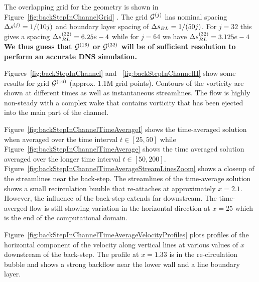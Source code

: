 The overlapping grid for the geometry is shown in Figure~\ref{fig:backStepInChannelGrid} . 
The grid ${\mathcal G}^{(j)}$ has nominal spacing $\Delta s^{(j)}=1/(10 j)$ and boundary layer spacing of $\Delta s_{BL}=1/(50 j)$. 
For $j=32$ this gives a spacing $\Delta s_{BL}^{(32)} = 6.25e-4$ while for $j=64$  we have $\Delta s_{BL}^{(32)} = 3.125e-4$
{\bf We thus guess that ${\mathcal G}^{(16)}$ or ${\mathcal G}^{(32)}$ will be of sufficient resolution to perform an accurate DNS simulation.}

\bigskip
Figures~\ref{fig:backStepInChannel} and ~\ref{fig:backStepInChannelII} show some results for grid ${\mathcal G}^{(16)}$ (approx. 1.1M grid points).
Contours of the vorticity are shown at different times as well as instantaneous streamlines. 
The flow is highly non-steady with a complex wake that contains vorticity that has been ejected 
into the main part of the channel.

Figure~\ref{fig:backStepInChannelTimeAverageI} shows the time-averaged solution when averaged over the time interval $t\in[25,50]$
while Figure~\ref{fig:backStepInChannelTimeAverage} shows the time averaged solution averaged over the longer time 
interval $t\in[50,200]$.
Figure~\ref{fig:backStepInChannelTimeAverageStreamLinesZoom} shows a closeup of the streamlines near the back-step.
The streamlines of the time-average solution shows a small recirculation buuble that re-attaches at approximately $x=2.1$. 
However, the influence of the back-step extends far downstream. The time-averged flow is still showing variation
in the horizontal direction at $x=25$ which is the end of the computational domain. 

Figure~\ref{fig:backStepInChannelTimeAverageVelocityProfiles} plots profiles of the horizontal component of the
velocity along vertical lines at various values of $x$ downstream of the back-step. 
The profile at $x=1.33$ is in the re-circulation bubble and shows a strong backflow near the lower wall and
a line boundary layer. 

